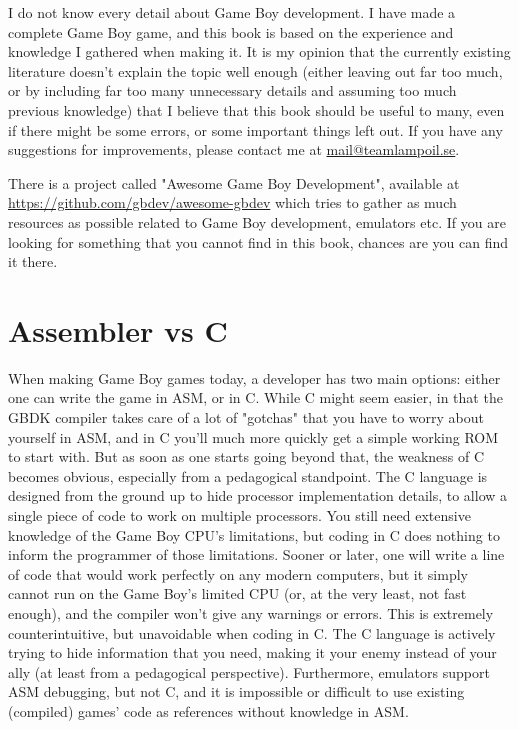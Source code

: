 \documentclass[11pt]{book}
\begin{document}
I do not know every detail about Game Boy development. I have made a complete Game Boy game, and this book is based on the experience and knowledge I gathered when making it. It is my opinion that the currently existing literature doesn't explain the topic well enough (either leaving out far too much, or by including far too many unnecessary details and assuming too much previous knowledge) that I believe that this book should be useful to many, even if there might be some errors, or some important things left out. If you have any suggestions for improvements, please contact me at \url{mail@teamlampoil.se}. 

There is a project called "Awesome Game Boy Development", available at \url{https://github.com/gbdev/awesome-gbdev} which tries to gather as much resources as possible related to Game Boy development, emulators etc. If you are looking for something that you cannot find in this book, chances are you can find it there.

\section{Assembler vs C}
\label{asmvsc}
When making Game Boy games today, a developer has two main options: either one can write the game in ASM, or in C. While C might seem easier, in that the GBDK compiler takes care of a lot of "gotchas" that you have to worry about yourself in ASM, and in C you'll much more quickly get a simple working ROM to start with. But as soon as one starts going beyond that, the weakness of C becomes obvious, especially from a pedagogical standpoint. The C language is designed from the ground up to hide processor implementation details, to allow a single piece of code to work on multiple processors. You still need extensive knowledge of the Game Boy CPU's limitations, but coding in C does nothing to inform the programmer of those limitations. Sooner or later, one will write a line of code that would work perfectly on any modern computers, but it simply cannot run on the Game Boy's limited CPU (or, at the very least, not fast enough), and the compiler won't give any warnings or errors. This is extremely counterintuitive, but unavoidable when coding in C. The C language is actively trying to hide  information that you need, making it your enemy instead of your ally (at least from a pedagogical perspective). Furthermore, emulators support ASM debugging, but not C, and it is impossible or difficult to use existing (compiled) games’ code as references without knowledge in ASM. 
\end{document}
